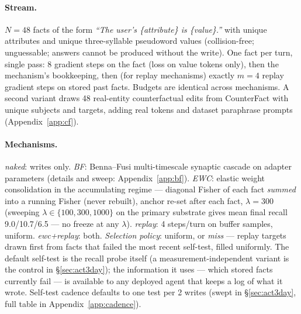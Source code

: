 \documentclass[11pt]{article}
\begin{document}
\paragraph{Stream.} $N{=}48$ facts of the form \emph{``The user's \{attribute\} is \{value\}.''}
with unique attributes and unique three-syllable pseudoword values (collision-free; unguessable;
answers cannot be produced without the write). One fact per turn, single pass: 8 gradient steps
on the fact (loss on value tokens only), then the mechanism's bookkeeping, then (for replay
mechanisms) exactly $m{=}4$ replay gradient steps on stored past facts. Budgets are identical
across mechanisms. A second variant draws 48 real-entity counterfactual edits from CounterFact
\citep{meng2022rome} with unique subjects and targets, adding real tokens and dataset paraphrase
prompts (Appendix~\ref{app:cf}).

\paragraph{Mechanisms.} \emph{naked}: writes only. \emph{BF}: Benna--Fusi multi-timescale
synaptic cascade \citep{benna2016} on adapter parameters (details and sweep:
Appendix~\ref{app:bf}). \emph{EWC}: elastic weight consolidation \citep{kirkpatrick2017} in the
accumulating regime --- diagonal Fisher of each fact \emph{summed} into a running Fisher (never
rebuilt), anchor re-set after each fact, $\lambda{=}300$ (sweeping $\lambda \in \{100, 300,
1000\}$ on the primary substrate gives mean final recall 9.0/10.7/6.5 --- no freeze at any
$\lambda$). \emph{replay}: 4 steps/turn on buffer samples, uniform.
\emph{ewc+replay}: both. \emph{Selection policy}: uniform, or \emph{miss} --- replay targets
drawn first from facts that failed the most recent self-test, filled uniformly. The default
self-test is the recall probe itself (a measurement-independent variant is the control in
\S\ref{sec:act3day}); the information it uses --- which stored facts currently fail --- is
available to any deployed agent that keeps a log of what it wrote. Self-test cadence defaults to
one test per 2 writes (swept in \S\ref{sec:act3day}, full table in Appendix~\ref{app:cadence}).
\end{document}
